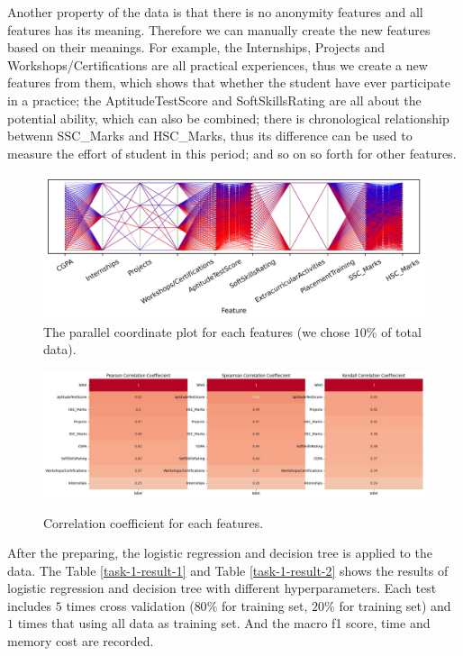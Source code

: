 \documentclass[11pt]{article}
\begin{document}
Another property of the data is that there is no anonymity features and all features has its meaning. Therefore we can manually create the new features based on their meanings. For example, the Internships, Projects and Workshops/Certifications are all practical experiences, thus we create a new features from them, which shows that whether the student have ever participate in a practice; the AptitudeTestScore and SoftSkillsRating are all about the potential ability, which can also be combined; there is chronological relationship betwenn SSC\_Marks and HSC\_Marks, thus its difference can be used to measure the effort of student in this period; and so on so forth for other features.

\begin{figure}[H]
  \centering
  \includegraphics[width=\textwidth]{../code/Task1/Analysis/PC.jpg}
  \caption{The parallel coordinate plot for each features (we chose $10\%$ of total data).}
  \label{task-1-data-distribution}
\end{figure}

\begin{figure}[H]
  \centering
  \includegraphics[width=\textwidth]{../code/Task1/Analysis/corrcoef.jpg} \\
  \caption{Correlation coefficient for each features.}
  \label{task-1-correlation-coefficient}
\end{figure}

After the preparing, the logistic regression and decision tree is applied to the data. The Table \ref{task-1-result-1} and Table \ref{task-1-result-2} shows the results of logistic regression and decision tree with different hyperparameters. Each test includes $5$ times cross validation ($80\%$ for training set, $20\%$ for training set) and $1$ times that using all data as training set. And the macro f1 score, time and memory cost are recorded.
\end{document}
